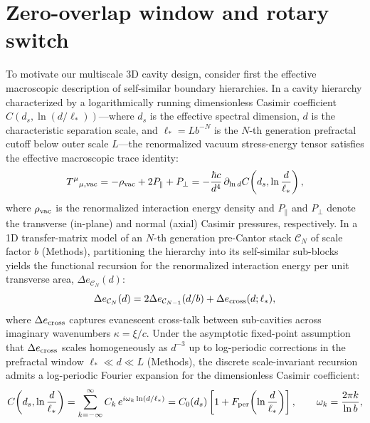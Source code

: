 \documentclass[pdflatex,sn-nature]{sn-jnl}
\begin{document}
\section*{Zero-overlap window and rotary switch}
\label{sec:architecture}

To motivate our multiscale 3D cavity design, consider first the effective macroscopic description of self-similar boundary hierarchies\cite{gordon2026prd}. In a cavity hierarchy characterized by a logarithmically running dimensionless Casimir coefficient $C(d_s, \ln(d/\ell_*))$---where $d_s$ is the effective spectral dimension, $d$ is the characteristic separation scale, and $\ell_* = L b^{-N}$ is the $N$-th generation prefractal cutoff below outer scale $L$---the renormalized vacuum stress-energy tensor satisfies the effective macroscopic trace identity\cite{gordon2026prd}:
\begin{equation}
T^\mu{}_{\mu,\rm vac} = -\rho_{\rm vac} + 2P_\parallel + P_\perp = -\frac{\hbar c}{d^4} \,\partial_{\ln d}C\!\left(d_s, \ln\frac{d}{\ell_*}\right),
\label{eq:trace_running}
\end{equation}
where $\rho_{\rm vac}$ is the renormalized interaction energy density and $P_\parallel$ and $P_\perp$ denote the transverse (in-plane) and normal (axial) Casimir pressures, respectively. In a 1D transfer-matrix model of an $N$-th generation pre-Cantor stack $\mathcal{C}_N$ of scale factor $b$ (Methods), partitioning the hierarchy into its self-similar sub-blocks yields the functional recursion for the renormalized interaction energy per unit transverse area, $\Delta e_{\mathcal{C}_N}(d)$:
\begin{equation}
\Delta e_{\mathcal{C}_N}(d) = 2 \Delta e_{\mathcal{C}_{N-1}}(d/b) + \Delta e_{\rm cross}(d; \ell_*),
\label{eq:recursion_main}
\end{equation}
where $\Delta e_{\rm cross}$ captures evanescent cross-talk between sub-cavities across imaginary wavenumbers $\kappa = \xi/c$. Under the asymptotic fixed-point assumption that $\Delta e_{\rm cross}$ scales homogeneously as $d^{-3}$ up to log-periodic corrections in the prefractal window $\ell_* \ll d \ll L$ (Methods), the discrete scale-invariant recursion admits a log-periodic Fourier expansion for the dimensionless Casimir coefficient:
\begin{equation}
C\!\left(d_s, \ln\frac{d}{\ell_*}\right) = \sum_{k=-\infty}^{\infty} C_k \, e^{i \omega_k \ln(d/\ell_*)} = C_0(d_s) \left[ 1 + F_{\rm per}\!\left(\ln\frac{d}{\ell_*}\right) \right], \qquad \omega_k = \frac{2\pi k}{\ln b},
\label{eq:fourier_running}
\end{equation}
\end{document}
